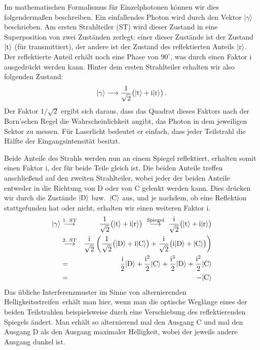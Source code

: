 Im mathematischen Formalismus f\"ur Einzelphotonen k\"onnen wir dies folgenderma\ss en
beschreiben. Ein einfallendes Photon wird durch den Vektor $|\gamma\rangle$ beschrieben.
Am ersten Strahlteiler (ST) wird dieser Zustand in eine Superposition von zwei Zust\"anden 
zerlegt: einer dieser Zust\"ande ist der Zustand $|{\rm t}\rangle$ (f\"ur transmittiert), der andere ist der
Zustand des reflektierten Anteils $|{\rm r}\rangle$. Der reflektierte Anteil erh\"alt noch eine Phase von
$90^\circ$, was durch einen Faktor i ausgedr\"uckt werden kann. Hinter dem ersten Strahlteiler
erhalten wir also folgenden Zustand:
\begin{equation}
           |\gamma \rangle  \longrightarrow  \frac{1}{\sqrt{2}} \big( |{\rm t}\rangle + {\rm i} |{\rm r}\rangle \big) \, .
\end{equation}
Der Faktor $1/\sqrt{2}$ ergibt sich daraus, dass das Quadrat dieses Faktors nach der Born'schen
Regel die Wahrscheinlichkeit angibt, das Photon in dem jeweiligen Sektor zu messen. F\"ur
Laserlicht bedeutet er einfach, dass jeder Teilstrahl die H\"alfte der Eingangsintensit\"at besitzt. 

Beide Anteile des Strahls werden nun an einem Spiegel reflektiert, erhalten somit einen 
Faktor i, der f\"ur beide Teile gleich ist. Die beiden
Anteile treffen anschlie\ss end auf den zweiten Strahlteiler, wobei jeder der beiden Anteile
entweder in die Richtung von D oder von C gelenkt werden kann. Dies dr\"ucken wir durch die
Zust\"ande $|{\rm D}\rangle$ bzw.\ $|{\rm C}\rangle$ aus, und je nachdem, ob eine Reflektion stattgefunden
hat oder nicht, erhalten wir einen weiteren Faktor i.
\begin{eqnarray}
  |\gamma \rangle & \stackrel{\rm 1.~ST}{\longrightarrow}  & 
    \frac{1}{\sqrt{2}} \big( |{\rm t}\rangle + {\rm i}   |{\rm r}\rangle \big) 
    ~ \stackrel{\rm Spiegel}{\longrightarrow} ~ 
    \frac{\rm i}{\sqrt{2}} \big( |{\rm t}\rangle + {\rm i}    |{\rm r}\rangle \big) \\
\label{eq_Feynman1}    
    & \stackrel{\rm 2.~ST}{\longrightarrow} &
    \frac{\rm i}{\sqrt{2}} \left(   \frac{1}{\sqrt{2}} \big(  |{\rm D}\rangle + {\rm i}  |{\rm C}\rangle \big)
    + \frac{\rm i}{\sqrt{2}} \big({\rm i}     |{\rm D}\rangle  + |{\rm C}\rangle \big) \right)  \\
\label{eq_DCDC}    
    & =  &
    \frac{\rm i}{2}  |{\rm D}\rangle  +  \frac{{\rm i}^2}{2} |{\rm C}\rangle 
    + \frac{{\rm i}^3}{2}  |{\rm D}\rangle  + \frac{{\rm i}^2}{2} |{\rm C}\rangle \\
    & = &  - |{\rm C} \rangle 
\end{eqnarray}
Das \"ubliche Interferenzmuster im Sinne von \glqq alternierenden Helligkeitsstreifen\grqq\ erh\"alt man
hier, wenn man die optische Wegl\"ange eines der beiden Teilstrahlen beispielsweise durch eine
Verschiebung des reflektierenden Spiegels \"andert. 
Man erh\"alt so alternierend mal den Ausgang C und
mal den Ausgang D als den Ausgang maximaler Helligkeit, wobei der jeweils andere Ausgang dunkel ist.  
  
